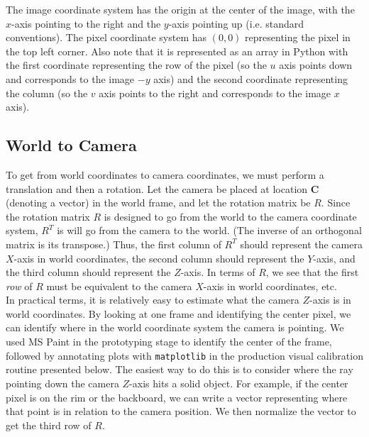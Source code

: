 \documentclass{article}
\begin{document}
The image coordinate system has the origin at the center of the image, with the $x$-axis pointing to the right and the $y$-axis pointing up (i.e. standard conventions). 
The pixel coordinate system has $(0, 0)$ representing the pixel in the top left corner. 
Also note that it is represented as an array in Python with the first coordinate representing the row of the pixel 
(so the $u$ axis points down and corresponds to the image $-y$ axis) and the second coordinate representing the column 
(so the $v$ axis points to the right and corresponds to the image $x$ axis).

\subsection{World to Camera}
To get from world coordinates to camera coordinates, we must perform a translation and then a rotation. 
Let the camera be placed at location $\bm{C}$ (denoting a vector) in the world frame, and let the rotation matrix be $R$. 
Since the rotation matrix $R$ is designed to go from the world to the camera coordinate system, $R^{T}$ is will go from the camera to the world. 
(The inverse of an orthogonal matrix is its transpose.)
Thus, the first column of $R^{T}$ should represent the camera $X$-axis in world coordinates, the second column should represent the $Y$-axis, 
and the third column should represent the $Z$-axis. 
In terms of $R$, we see that the first \textit{row} of $R$ must be equivalent to the camera $X$-axis in world coordinates, etc. \\

In practical terms, it is relatively easy to estimate what the camera $Z$-axis is in world coordinates. 
By looking at one frame and identifying the center pixel, we can identify where in the world coordinate system the camera is pointing. 
We used MS Paint in the prototyping stage to identify the center of the frame, followed by annotating plots with \texttt{matplotlib} in the
production visual calibration routine presented below.
The easiest way to do this is to consider where the ray pointing down the camera $Z$-axis hits a solid object. 
For example, if the center pixel is on the rim or the backboard, we can write a vector representing where that point is in relation to the camera position. 
We then normalize the vector to get the third row of $R$. \\
\end{document}
